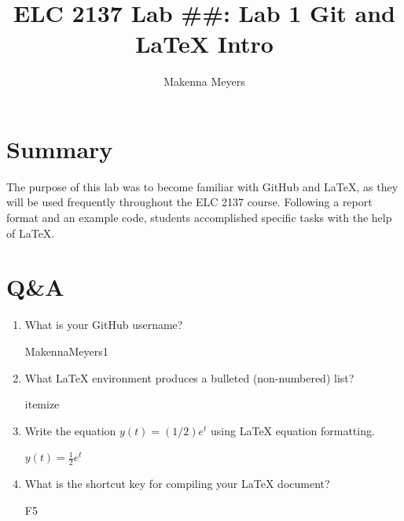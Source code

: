 \documentclass[11pt]{article}
\begin{document}
\title{ELC 2137 Lab \#\#: Lab 1 Git and LaTeX Intro}
\author{Makenna Meyers}

\maketitle


\section*{Summary}

The purpose of this lab was to become familiar with GitHub and LaTeX, as they will be used frequently throughout the ELC 2137 course. Following a report format and an example code, students accomplished specific tasks with the help of LaTeX. 


\section*{Q\&A}

\begin{enumerate}
	\item What is your GitHub username?
	
	MakennaMeyers1
	
	\item What LaTeX environment produces a bulleted (non-numbered) list?
	
	itemize
	
	\item Write the equation $y(t) = (1/2)e^t$ using LaTeX equation formatting.
	
	$y(t) = \frac{1}{2}e^t$
	
	\item What is the shortcut key for compiling your LaTeX document?
	
	F5
\end{enumerate}
\end{document}
